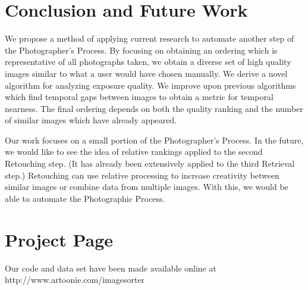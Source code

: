 \documentclass{article}
\begin{document}
\section{Conclusion and Future Work}
We propose a method of applying current research to automate another step of the Photographer's Process. By focusing on obtaining an ordering which is representative of all photographs taken, we obtain a diverse set of high quality images similar to what a user would have chosen manually. We derive a novel algorithm for analyzing exposure quality. We improve upon previous algorithms which find temporal gaps between images to obtain a metric for temporal nearness. The final ordering depends on both the quality ranking and the number of similar images which have already appeared.

Our work focuses on a small portion of the Photographer's Process. In the future, we would like to see the idea of relative rankings applied to the second Retouching step. (It has already been extensively applied to the third Retrieval step.) Retouching can use relative processing to increase creativity between similar images or combine data from multiple images. With this, we would be able to automate the Photographic Process.

\section{Project Page}
Our code and data set have been made available online at http://www.artoonie.com/imagesorter

{\footnotesize
 
 
}
\end{document}
